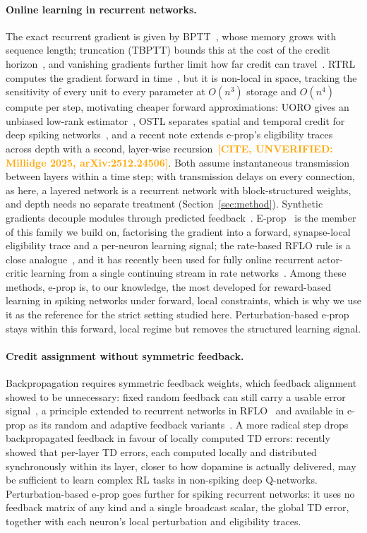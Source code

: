 \documentclass[10pt,twocolumn]{article}
\newcommand{\unverified}[1]{\textcolor{orange}{\bfseries[CITE, UNVERIFIED: #1]}}
\newcommand{\Method}{Perturbation-based e-prop}   %
\begin{document}
\paragraph{Online learning in recurrent networks.}
The exact recurrent gradient is given by BPTT~\citep{Werbos1990BackpropagationTT},
whose memory grows with sequence length; truncation (TBPTT) bounds this at the
cost of the credit horizon~\citep{WilliamsZipser1995}, and vanishing gradients
further limit how far credit can travel~\citep{learningLongTermHard}. RTRL
computes the gradient forward in time~\citep{RTRL}, but it is non-local in
space, tracking the sensitivity of every unit to every parameter at $O(n^3)$
storage and $O(n^4)$ compute per step,
motivating cheaper forward approximations: UORO gives an unbiased low-rank
estimator~\citep{UORO}, OSTL separates spatial and temporal credit for deep
spiking networks~\citep{OSTL}, and a recent note extends e-prop's eligibility traces
across depth with a second, layer-wise recursion~\unverified{Millidge 2025,
arXiv:2512.24506}. Both assume instantaneous transmission between layers within a time
step; with transmission delays on every connection, as here, a layered network is a
recurrent network with block-structured weights, and depth needs no separate treatment
(Section~\ref{sec:method}). Synthetic gradients decouple modules through
predicted feedback~\citep{Jaderberg2016}. E-prop~\citep{eprop2020} is the member
of this family we build on, factorising the gradient into a forward,
synapse-local eligibility trace and a per-neuron learning signal; the rate-based
RFLO rule is a close analogue~\citep{murray2019local}, and it has recently been
used for fully online recurrent actor-critic learning from a single continuing
stream in rate networks~\citep{Lemmel2025RTRRL}. Among these methods,
e-prop is, to our knowledge, the most developed for reward-based learning in
spiking networks under forward, local constraints, which is why we use it as
the reference for the strict setting studied here. \Method{} stays
within this forward, local regime but removes the structured learning signal.

\paragraph{Credit assignment without symmetric feedback.}
Backpropagation requires symmetric feedback weights, which feedback alignment
showed to be unnecessary: fixed random feedback can still carry a usable error
signal~\citep{Lillicrap2016}, a principle extended to recurrent networks in
RFLO~\citep{murray2019local} and available in e-prop as its random and adaptive
feedback variants~\citep{eprop2020}. A more radical step drops backpropagated
feedback in favour of locally computed TD errors: \citet{guan2024artificialdopamine}
recently showed that per-layer TD errors, each computed locally and
distributed synchronously within its layer, closer to how dopamine is actually
delivered, may be sufficient to learn complex RL tasks in non-spiking deep
Q-networks. \Method{} goes further for spiking recurrent networks: it
uses no feedback matrix of any kind and a single broadcast scalar, the global
TD error, together with each neuron's local perturbation and eligibility
traces.
\end{document}
